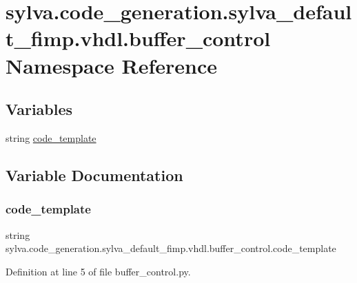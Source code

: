 \hypertarget{namespacesylva_1_1code__generation_1_1sylva__default__fimp_1_1vhdl_1_1buffer__control}{}\section{sylva.\+code\+\_\+generation.\+sylva\+\_\+default\+\_\+fimp.\+vhdl.\+buffer\+\_\+control Namespace Reference}
\label{namespacesylva_1_1code__generation_1_1sylva__default__fimp_1_1vhdl_1_1buffer__control}
\subsection*{Variables}
\begin{DoxyCompactItemize}
\item 
string \hyperlink{namespacesylva_1_1code__generation_1_1sylva__default__fimp_1_1vhdl_1_1buffer__control_a42afe3af4e071c813351873cb6e316df}{code\+\_\+template}
\end{DoxyCompactItemize}


\subsection{Variable Documentation}
\mbox{\label{namespacesylva_1_1code__generation_1_1sylva__default__fimp_1_1vhdl_1_1buffer__control_a42afe3af4e071c813351873cb6e316df}} 
\subsubsection{\texorpdfstring{code\+\_\+template}{code\_template}}
{\footnotesize\ttfamily string sylva.\+code\+\_\+generation.\+sylva\+\_\+default\+\_\+fimp.\+vhdl.\+buffer\+\_\+control.\+code\+\_\+template}



Definition at line 5 of file buffer\+\_\+control.\+py.


